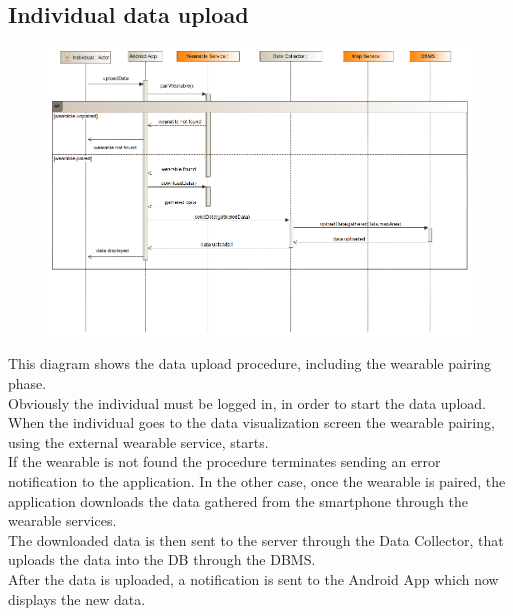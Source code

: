 \subsection{Individual data upload}
\begin{figure}[H]
\centering
\includegraphics[width=\linewidth]{resources/uml/sequence/wearablePairing.png}
\end{figure}
This diagram shows the data upload procedure, including the wearable pairing phase.\\
Obviously the individual must be logged in, in order to start the data upload.\\
When the individual goes to the data visualization screen the wearable pairing, using the external wearable service, starts.\\
If the wearable is not found the procedure terminates sending an error notification to the application.
In the other case, once the wearable is paired, the application downloads the data gathered from the smartphone through the wearable services.\\
The downloaded data is then sent to the server through the Data Collector, that uploads the data into the DB through the DBMS.\\
After the data is uploaded, a notification is sent to the Android App which now displays the new data.

